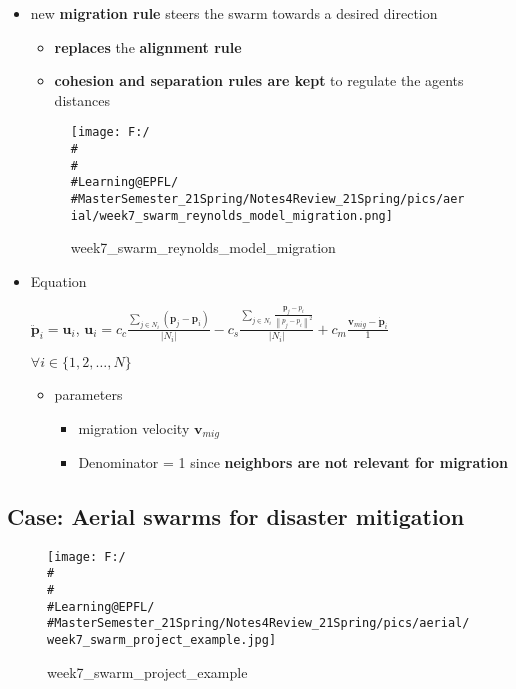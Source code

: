 \documentclass[]{article}
\begin{document}
\begin{itemize}
\item
  new \textbf{migration rule} steers the swarm towards a desired
  direction

  \begin{itemize}
  \item
    \textbf{replaces} the \textbf{alignment rule}
  \item
    \textbf{cohesion and separation rules are kept} to regulate the
    agents distances
  \end{itemize}

  \begin{figure}
  \centering
  \texttt{[image: F:/\\\#\\\#\\\#Learning@EPFL/\\\#MasterSemester\_21Spring/Notes4Review\_21Spring/pics/aerial/week7\_swarm\_reynolds\_model\_migration.png]}
  \caption{week7\_swarm\_reynolds\_model\_migration}
  \end{figure}
\item
  Equation

  \(\ddot{\mathbf{p}}_{i}=\mathbf{u}_{i}\),
  \(\mathbf{u}_{i}=c_{c} \frac{\sum_{j \in N_{i}}\left(\mathbf{p}_{j}-\mathbf{p}_{i}\right)}{\left|N_{i}\right|}-c_{s} \frac{\sum_{j \in N_{i}} \frac{\mathbf{p}_{j}-p_{i}}{\left\|p_{j}-p_{i}\right\|^{2}}}{\left|N_{i}\right|}+c_m \frac{\mathbf{v}_{mig}-\dot{\mathbf{p}}_i}{1}\)

  \(\forall i \in\{1,2, \ldots, N\}\)

  \begin{itemize}
  \item
    parameters

    \begin{itemize}
    \item
      migration velocity \(\mathbf{v}_{mig}\)
    \item
      Denominator = 1 since \textbf{neighbors are not relevant for
      migration}
    \end{itemize}
  \end{itemize}
\end{itemize}

\subsection{Case: Aerial swarms for disaster
mitigation}\label{header-n1320}

\begin{figure}
\centering
\texttt{[image: F:/\\\#\\\#\\\#Learning@EPFL/\\\#MasterSemester\_21Spring/Notes4Review\_21Spring/pics/aerial/week7\_swarm\_project\_example.jpg]}
\caption{week7\_swarm\_project\_example}
\end{figure}
\end{document}

